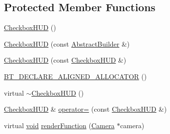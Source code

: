 \subsection*{Protected Member Functions}
\begin{DoxyCompactItemize}
\item 
\mbox{\hyperlink{classnjli_1_1_checkbox_h_u_d_aec11f8636407a40541f56c650ac8ce3e}{Checkbox\+H\+UD}} ()
\item 
\mbox{\hyperlink{classnjli_1_1_checkbox_h_u_d_a85dcc4809caadfeb82fbfc48e9fbc33e}{Checkbox\+H\+UD}} (const \mbox{\hyperlink{classnjli_1_1_abstract_builder}{Abstract\+Builder}} \&)
\item 
\mbox{\hyperlink{classnjli_1_1_checkbox_h_u_d_a3eb6d43b7a6bc7f47f0d6619bb226d11}{Checkbox\+H\+UD}} (const \mbox{\hyperlink{classnjli_1_1_checkbox_h_u_d}{Checkbox\+H\+UD}} \&)
\item 
\mbox{\hyperlink{classnjli_1_1_checkbox_h_u_d_adbd098f0f7b90603014c8c45df1fab91}{B\+T\+\_\+\+D\+E\+C\+L\+A\+R\+E\+\_\+\+A\+L\+I\+G\+N\+E\+D\+\_\+\+A\+L\+L\+O\+C\+A\+T\+OR}} ()
\item 
virtual \mbox{\hyperlink{classnjli_1_1_checkbox_h_u_d_a6e3854c02a8506227af0323475ac52a2}{$\sim$\+Checkbox\+H\+UD}} ()
\item 
\mbox{\hyperlink{classnjli_1_1_checkbox_h_u_d}{Checkbox\+H\+UD}} \& \mbox{\hyperlink{classnjli_1_1_checkbox_h_u_d_a750ebe87c1e2357b8d434200568420f4}{operator=}} (const \mbox{\hyperlink{classnjli_1_1_checkbox_h_u_d}{Checkbox\+H\+UD}} \&)
\item 
virtual \mbox{\hyperlink{_thread_8h_af1e856da2e658414cb2456cb6f7ebc66}{void}} \mbox{\hyperlink{classnjli_1_1_checkbox_h_u_d_a9a833ae0ac0412333e305dad18a46c6b}{render\+Function}} (\mbox{\hyperlink{classnjli_1_1_camera}{Camera}} $\ast$camera)
\end{DoxyCompactItemize}
